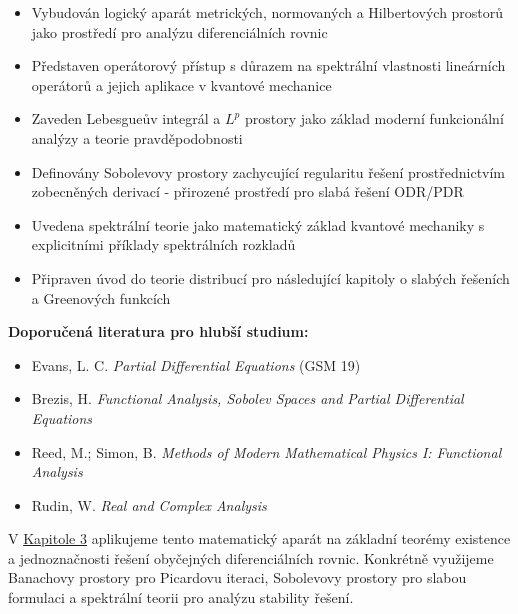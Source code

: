 \begin{itemize}
\item Vybudován logický aparát metrických, normovaných a Hilbertových prostorů jako prostředí pro analýzu diferenciálních rovnic

\item Představen operátorový přístup s důrazem na spektrální vlastnosti lineárních operátorů a jejich aplikace v kvantové mechanice

\item Zaveden Lebesgueův integrál a $L^p$ prostory jako základ moderní funkcionální analýzy a teorie pravděpodobnosti

\item Definovány Sobolevovy prostory zachycující regularitu řešení prostřednictvím zobecněných derivací - přirozené prostředí pro slabá řešení ODR/PDR

\item Uvedena spektrální teorie jako matematický základ kvantové mechaniky s explicitními příklady spektrálních rozkladů

\item Připraven úvod do teorie distribucí pro následující kapitoly o slabých řešeních a Greenových funkcích
\end{itemize}

\begin{literature}
\textbf{Doporučená literatura pro hlubší studium:}
\begin{itemize}
\item Evans, L. C. \emph{Partial Differential Equations} (GSM 19)
\item Brezis, H. \emph{Functional Analysis, Sobolev Spaces and Partial Differential Equations}
\item Reed, M.; Simon, B. \emph{Methods of Modern Mathematical Physics I: Functional Analysis}
\item Rudin, W. \emph{Real and Complex Analysis}
\end{itemize}
\end{literature}

\begin{transition}
V \hyperref[sec:zakladni-teoremy]{Kapitole 3} aplikujeme tento matematický aparát na základní teorémy existence a jednoznačnosti řešení obyčejných diferenciálních rovnic. Konkrétně využijeme Banachovy prostory pro Picardovu iteraci, Sobolevovy prostory pro slabou formulaci a spektrální teorii pro analýzu stability řešení.
\end{transition}

\spc